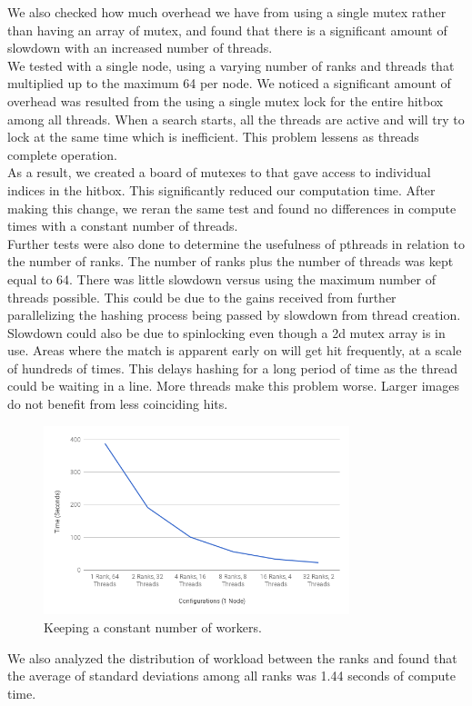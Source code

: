 \documentclass[10pt, journal]{vgtc}                %
\newcommand\tab[1][1cm]{\hspace*{#1}}
\begin{document}
\begin{flushleft}
\tab We also checked how much overhead we have from using a single mutex rather than having an array of mutex, and found that there is a significant amount of slowdown with an increased number of threads. \\\smallskip
We tested with a single node, using a varying number of ranks and threads that multiplied up to the maximum 64 per node. We noticed a significant amount of overhead was resulted from the using a single mutex lock for the entire hitbox among all threads. When a search starts, all the threads are active and will try to lock at the same time which is inefficient. This problem lessens as threads complete operation.\\\smallskip
\tab As a result, we created a board of mutexes to that gave access to individual indices in the hitbox. This significantly reduced our computation time. After making this change, we reran the same test and found no differences in compute times with a constant number of threads. \\\smallskip
\tab Further tests were also done to determine the usefulness of pthreads in relation to the number of ranks. The number of ranks plus the number of threads was kept equal to 64. There was little slowdown versus using the maximum number of threads possible. This could be due to the gains received from further parallelizing the hashing process being passed by slowdown from thread creation. Slowdown could also be due to spinlocking even though a 2d mutex array is in use. Areas where the match is apparent early on will get hit frequently, at a scale of hundreds of times. This delays hashing for a long period of time as the thread could be waiting in a line. More threads make this problem worse. Larger images do not benefit from less coinciding hits.\\\smallskip
	\begin{figure}[h!]
		\centering
		\includegraphics[width=3.5in]{64.png}
		\caption{Keeping a constant number of workers.}
	\end{figure}
\tab We also analyzed the distribution of workload between the ranks and found that the average of standard deviations among all ranks was 1.44 seconds of compute time. 
\end{flushleft}
\end{document}
